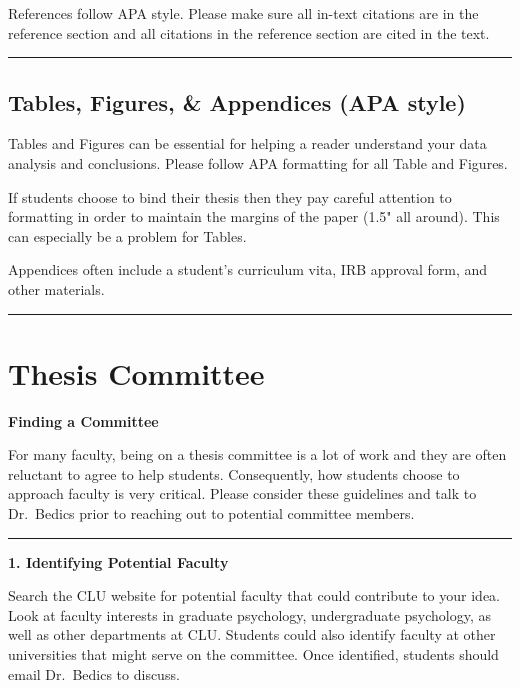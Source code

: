 \documentclass[openany]{book}
\begin{document}
References follow APA style. Please make sure all in-text citations are in the reference section and all citations in the reference section are cited in the text.

\begin{center}\rule{0.5\linewidth}{0.5pt}\end{center}

\hypertarget{tables-figures-appendices-apa-style}{%
\section{Tables, Figures, \& Appendices (APA style)}\label{tables-figures-appendices-apa-style}}

Tables and Figures can be essential for helping a reader understand your data analysis and conclusions. Please follow APA formatting for all Table and Figures.

If students choose to bind their thesis then they pay careful attention to formatting in order to maintain the margins of the paper (1.5" all around). This can especially be a problem for Tables.

Appendices often include a student's curriculum vita, IRB approval form, and other materials.

\begin{center}\rule{0.5\linewidth}{0.5pt}\end{center}

\hypertarget{people}{%
\chapter{Thesis Committee}\label{people}}

\textbf{Finding a Committee}

For many faculty, being on a thesis committee is a lot of work and they are often reluctant to agree to help students. Consequently, how students choose to approach faculty is very critical. Please consider these guidelines and talk to Dr.~Bedics prior to reaching out to potential committee members.

\begin{center}\rule{0.5\linewidth}{0.5pt}\end{center}

\textbf{1. Identifying Potential Faculty}

Search the CLU website for potential faculty that could contribute to your idea. Look at faculty interests in graduate psychology, undergraduate psychology, as well as other departments at CLU. Students could also identify faculty at other universities that might serve on the committee. Once identified, students should email Dr.~Bedics to discuss.
\end{document}
